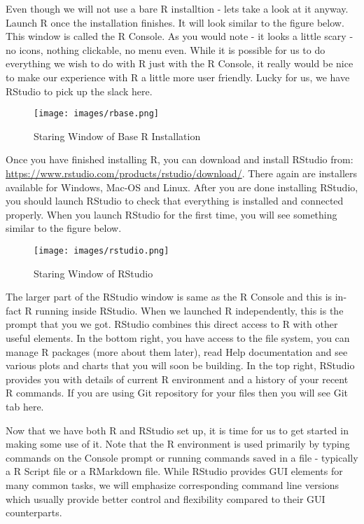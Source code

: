 \documentclass[
]{krantz}
\begin{document}
Even though we will not use a bare R installtion - lets take a look at it anyway. Launch R once the installation finishes. It will look similar to the figure below. This window is called the R Console. As you would note - it looks a little scary - no icons, nothing clickable, no menu even. While it is possible for us to do everything we wish to do with R just with the R Console, it really would be nice to make our experience with R a little more user friendly. Lucky for us, we have RStudio to pick up the slack here.

\begin{figure}
\centering
\texttt{[image: images/rbase.png]}
\caption{Staring Window of Base R Installation}
\end{figure}

Once you have finished installing R, you can download and install RStudio from: \url{https://www.rstudio.com/products/rstudio/download/}. There again are installers available for Windows, Mac-OS and Linux. After you are done installing RStudio, you should launch RStudio to check that everything is installed and connected properly. When you launch RStudio for the first time, you will see something similar to the figure below.

\begin{figure}
\centering
\texttt{[image: images/rstudio.png]}
\caption{Staring Window of RStudio}
\end{figure}

The larger part of the RStudio window is same as the R Console and this is in-fact R running inside RStudio. When we launched R independently, this is the prompt that you we got. RStudio combines this direct access to R with other useful elements. In the bottom right, you have access to the file system, you can manage R packages (more about them later), read Help documentation and see various plots and charts that you will soon be building. In the top right, RStudio provides you with details of current R environment and a history of your recent R commands. If you are using Git repository for your files then you will see Git tab here.

Now that we have both R and RStudio set up, it is time for us to get started in making some use of it. Note that the R environment is used primarily by typing commands on the Console prompt or running commands saved in a file - typically a R Script file or a RMarkdown file. While RStudio provides GUI elements for many common tasks, we will emphasize corresponding command line versions which usually provide better control and flexibility compared to their GUI counterparts.
\end{document}
